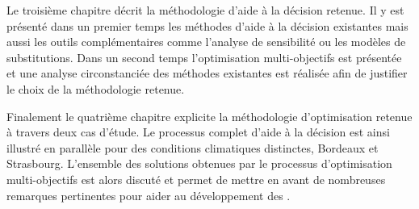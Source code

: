 Le troisième chapitre décrit la méthodologie d’aide à la décision retenue. Il y est
présenté dans un premier temps les méthodes d’aide à la décision existantes mais
aussi les outils complémentaires comme l’analyse de sensibilité ou les modèles
de substitutions. Dans un second temps l’optimisation multi-objectifs est présentée
et une analyse circonstanciée des méthodes existantes est réalisée afin de justifier
le choix de la méthodologie retenue.

Finalement le quatrième chapitre explicite la méthodologie d’optimisation retenue à
travers deux cas d’étude. Le processus complet d’aide à la décision est ainsi illustré
en parallèle pour des conditions climatiques distinctes, Bordeaux et Strasbourg. L’ensemble
des solutions obtenues par le processus d’optimisation multi-objectifs est alors discuté
et permet de mettre en avant de nombreuses remarques pertinentes pour aider au développement
des .
